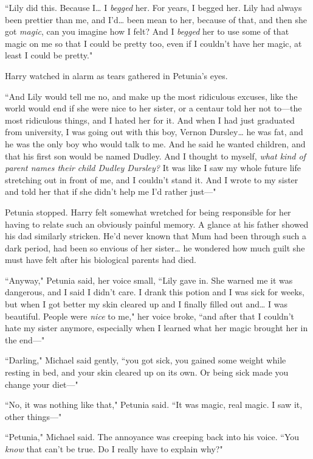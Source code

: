 ``Lily did this. Because I{\ldots} I \emph{begged} her. For years, I begged her. Lily had always been prettier than me, and I'd{\ldots} been mean to her, because of that, and then she got \emph{magic}, can you imagine how I felt? And I \emph{begged} her to use some of that magic on me so that I could be pretty too, even if I couldn't have her magic, at least I could be pretty."

Harry watched in alarm as tears gathered in Petunia's eyes.

``And Lily would tell me no, and make up the most ridiculous excuses, like the world would end if she were nice to her sister, or a centaur told her not to---the most ridiculous things, and I hated her for it. And when I had just graduated from university, I was going out with this boy, Vernon Dursley{\ldots} he was fat, and he was the only boy who would talk to me. And he said he wanted children, and that his first son would be named Dudley. And I thought to myself, \emph{what kind of parent names their child Dudley Dursley?} It was like I saw my whole future life stretching out in front of me, and I couldn't stand it. And I wrote to my sister and told her that if she didn't help me I'd rather just---"

Petunia stopped. Harry felt somewhat wretched for being responsible for her having to relate such an obviously painful memory. A glance at his father showed his dad similarly stricken. He'd never known that Mum had been through such a dark period, had been so envious of her sister{\ldots} he wondered how much guilt she must have felt after his biological parents had died.

``Anyway," Petunia said, her voice small, ``Lily gave in. She warned me it was dangerous, and I said I didn't care. I drank this potion and I was sick for weeks, but when I got better my skin cleared up and I finally filled out and{\ldots} I was beautiful. People were \emph{nice} to me," her voice broke, ``and after that I couldn't hate my sister anymore, especially when I learned what her magic brought her in the end---"

``Darling," Michael said gently, ``you got sick, you gained some weight while resting in bed, and your skin cleared up on its own. Or being sick made you change your diet---"

``No, it was nothing like that," Petunia said. ``It was magic, real magic. I saw it, other things---"

``Petunia," Michael said. The annoyance was creeping back into his voice. ``You \emph{know} that can't be true. Do I really have to explain why?"

